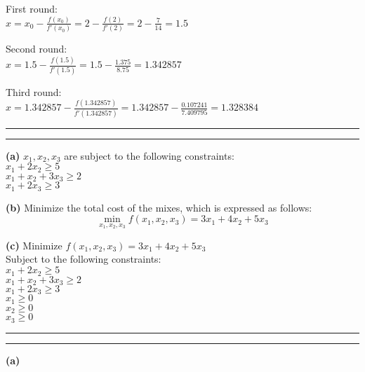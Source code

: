 \documentclass[11pt,letterpaper]{article}
\newcommand{\question}[1] {\vspace{.25in} \hrule\vspace{0.5em}
\noindent{\bf #1} \vspace{0.5em}
\hrule \vspace{.10in}}
\renewcommand{\part}[1] {\vspace{.10in} {\bf (#1)}}
\begin{document}
\newcommand{\newtx}[1]{#1 - \frac{f(#1)}{f'(#1)}}
\newcommand{\newtxx}[3]{#1 - \frac{#2}{#3}}
First round:\\
$x = \newtx{{x_0}} = \newtx{2} = \newtxx{2}{7}{14} = 1.5$

Second round:\\
$x =  \newtx{1.5} = \newtxx{1.5}{1.375}{8.75} = 1.342857$

Third round:\\
$x = \newtx{1.342857} = \newtxx{1.342857}{0.107241}{7.409795} = 1.328384$


\question{3}
\part{a}
$x_1, x_2, x_3$ are subject to the following constraints:\\
$x_1 + 2x_2 \geq 5$\\
$x_1 + x_2 + 3x_3 \geq 2$\\
$x_1 + 2x_3 \geq 3$

\part{b}
Minimize the total cost of the mixes, which is expressed as follows:
$$\min_{x_1, x_2, x_3} f(x_1, x_2, x_3) = 3x_1 + 4x_2 + 5x_3$$

\part{c}
Minimize $f(x_1, x_2, x_3) = 3x_1 + 4x_2 + 5x_3$\\
Subject to the following constraints:\\
$x_1 + 2x_2 \geq 5$\\
$x_1 + x_2 + 3x_3 \geq 2$\\
$x_1 + 2x_3 \geq 3$\\
$x_1 \geq 0$\\
$x_2 \geq 0$\\
$x_3 \geq 0$\\

\question{4}
\part{a}
\end{document}
